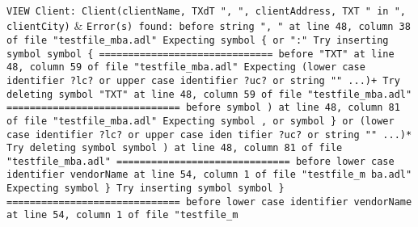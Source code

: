 \\\hline
\texttt{VIEW Client: Client(clientName, TXdT ", ", clientAddress, TXT " in ", clientCity)} & \texttt{Error(s) found:\newline
  \newline
  before string ", " at line 48, column 38 of file "testfile\_mba.adl"\newline
  Expecting symbol \{ or ":"\newline
  Try inserting symbol symbol \{\newline
  \newline
  ==============================\newline
  \newline
  before "TXT" at line 48, column 59 of file "testfile\_mba.adl"\newline
  Expecting (lower case identifier ?lc? or upper case identifier ?uc? or string ""\newline
   ...)+\newline
  Try deleting symbol "TXT" at line 48, column 59 of file "testfile\_mba.adl"\newline
  \newline
  ==============================\newline
  \newline
  before symbol ) at line 48, column 81 of file "testfile\_mba.adl"\newline
  Expecting symbol , or symbol \} or (lower case identifier ?lc? or upper case iden\newline
  tifier ?uc? or string "" ...)*\newline
  Try deleting symbol symbol ) at line 48, column 81 of file "testfile\_mba.adl"\newline
  \newline
  ==============================\newline
  \newline
  before lower case identifier vendorName at line 54, column 1 of file "testfile\_m\newline
  ba.adl"\newline
  Expecting symbol \}\newline
  Try inserting symbol symbol \}\newline
  \newline
  ==============================\newline
  \newline
  before lower case identifier vendorName at line 54, column 1 of file "testfile\_m\newline
}
